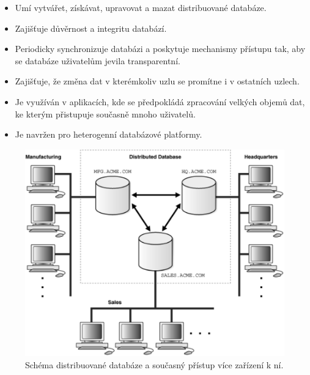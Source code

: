 \begin{itemize}
\item Umí vytvářet, získávat, upravovat a mazat distribuované databáze.

\item Zajišťuje důvěrnost a integritu databází.

\item Periodicky synchronizuje databázi a poskytuje mechanismy přístupu tak, aby se databáze uživatelům jevila transparentní.

\item Zajišťuje, že změna dat v kterémkoliv uzlu se promítne i v ostatních uzlech.

\item Je využíván v aplikacích, kde se předpokládá zpracování velkých objemů dat, ke kterým přistupuje současně mnoho uživatelů.

\item Je navržen pro heterogenní databázové platformy.
\end{itemize}

\begin{figure}[!h]
  \centering
  \includegraphics[width=15cm]{template-fig/Distributed_database.pdf}
  \caption{Schéma distribuované databáze a současný přístup více zařízení k ní. \cite{distributedDBMSPic}}
  \label{FIG_DistrDB}
\end{figure}

